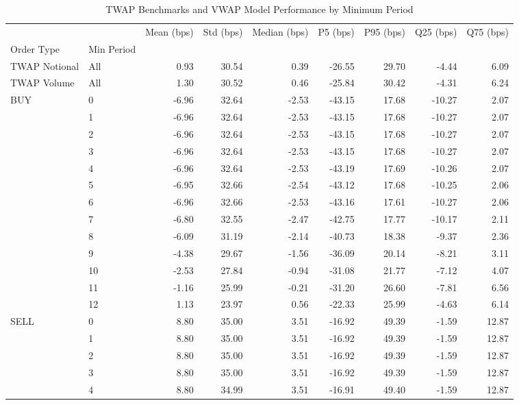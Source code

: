 \begin{table}
\caption{TWAP Benchmarks and VWAP Model Performance by Minimum Period}
\label{tab:comprehensive_performance}
\begin{tabular}{l|l|rrrrrrr}
\toprule
 &  & Mean (bps) & Std (bps) & Median (bps) & P5 (bps) & P95 (bps) & Q25 (bps) & Q75 (bps) \\
Order Type & Min Period &  &  &  &  &  &  &  \\
\midrule
TWAP Notional & All & 0.93 & 30.54 & 0.39 & -26.55 & 29.70 & -4.44 & 6.09 \\
\cline{1-9}
TWAP Volume & All & 1.30 & 30.52 & 0.46 & -25.84 & 30.42 & -4.31 & 6.24 \\
\cline{1-9}
\multirow[t]{13}{*}{BUY} & 0 & -6.96 & 32.64 & -2.53 & -43.15 & 17.68 & -10.27 & 2.07 \\
 & 1 & -6.96 & 32.64 & -2.53 & -43.15 & 17.68 & -10.27 & 2.07 \\
 & 2 & -6.96 & 32.64 & -2.53 & -43.15 & 17.68 & -10.27 & 2.07 \\
 & 3 & -6.96 & 32.64 & -2.53 & -43.15 & 17.68 & -10.27 & 2.07 \\
 & 4 & -6.96 & 32.64 & -2.53 & -43.19 & 17.69 & -10.26 & 2.07 \\
 & 5 & -6.95 & 32.66 & -2.54 & -43.12 & 17.68 & -10.25 & 2.06 \\
 & 6 & -6.96 & 32.66 & -2.53 & -43.16 & 17.61 & -10.27 & 2.06 \\
 & 7 & -6.80 & 32.55 & -2.47 & -42.75 & 17.77 & -10.17 & 2.11 \\
 & 8 & -6.09 & 31.19 & -2.14 & -40.73 & 18.38 & -9.37 & 2.36 \\
 & 9 & -4.38 & 29.67 & -1.56 & -36.09 & 20.14 & -8.21 & 3.11 \\
 & 10 & -2.53 & 27.84 & -0.94 & -31.08 & 21.77 & -7.12 & 4.07 \\
 & 11 & -1.16 & 25.99 & -0.21 & -31.20 & 26.60 & -7.81 & 6.56 \\
 & 12 & 1.13 & 23.97 & 0.56 & -22.33 & 25.99 & -4.63 & 6.14 \\
\cline{1-9}
\multirow[t]{13}{*}{SELL} & 0 & 8.80 & 35.00 & 3.51 & -16.92 & 49.39 & -1.59 & 12.87 \\
 & 1 & 8.80 & 35.00 & 3.51 & -16.92 & 49.39 & -1.59 & 12.87 \\
 & 2 & 8.80 & 35.00 & 3.51 & -16.92 & 49.39 & -1.59 & 12.87 \\
 & 3 & 8.80 & 35.00 & 3.51 & -16.92 & 49.39 & -1.59 & 12.87 \\
 & 4 & 8.80 & 34.99 & 3.51 & -16.91 & 49.40 & -1.59 & 12.87 \\

\end{tabular}
\end{table}
